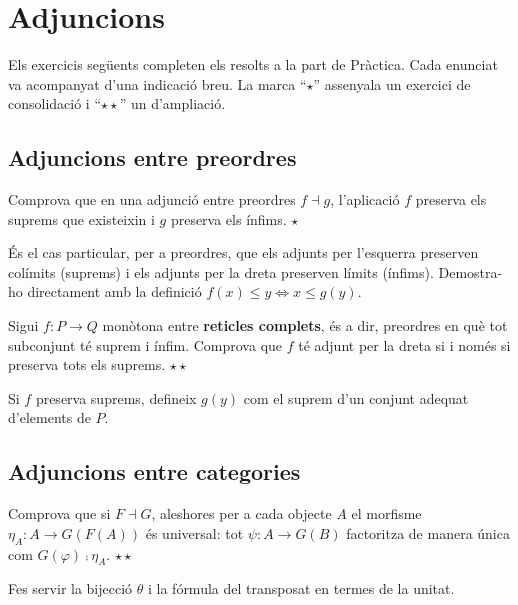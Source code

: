 \chapter[Adjuncions]{Adjuncions}

Els exercicis següents completen els resolts a la part de Pràctica. Cada enunciat va acompanyat d'una indicació breu. La marca \enquote{$\star$} assenyala un exercici de consolidació i \enquote{$\star\star$} un d'ampliació.

\section{Adjuncions entre preordres}

\begin{exercici}
Comprova que en una adjunció entre preordres $f\dashv g$, l'aplicació $f$ preserva els suprems que existeixin i $g$ preserva els ínfims. \hfill{\normalfont$\star$}
\begin{indicacio}
És el cas particular, per a preordres, que els adjunts per l'esquerra preserven colímits (suprems) i els adjunts per la dreta preserven límits (ínfims). Demostra-ho directament amb la definició $f(x)\leq y\Leftrightarrow x\leq g(y)$.
\end{indicacio}
\end{exercici}

\begin{exercici}
Sigui $f\colon P\to Q$ monòtona entre \textbf{reticles complets}, és a dir, preordres en què tot subconjunt té suprem i ínfim. Comprova que $f$ té adjunt per la dreta si i només si preserva tots els suprems. \hfill{\normalfont$\star\star$}
\begin{indicacio}
Si $f$ preserva suprems, defineix $g(y)$ com el suprem d'un conjunt adequat d'elements de $P$.
\end{indicacio}
\end{exercici}

\section{Adjuncions entre categories}

\begin{exercici}\label{exr:adj-unitat-universal}
Comprova que si $F\dashv G$, aleshores per a cada objecte $A$ el morfisme $\eta_A\colon A\to G(F(A))$ és universal: tot $\psi\colon A\to G(B)$ factoritza de manera única com $G(\varphi)\comp\eta_A$. \hfill{\normalfont$\star\star$}
\begin{indicacio}
Fes servir la bijecció $\theta$ i la fórmula del transposat en termes de la unitat.
\end{indicacio}
\end{exercici}

